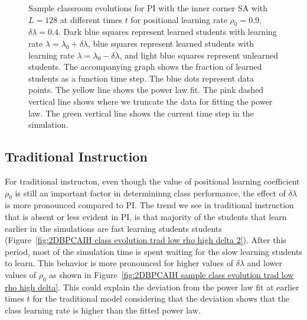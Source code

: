 \begin{figure}[htbp!]
   \caption{Sample classroom evolutions for PI with the inner corner SA with $L=128$ at different times $t$ for positional learning rate $\rho_0=0.9$, $\delta\lambda = 0.4$.
   Dark blue squares represent learned students with learning rate $\lambda = \lambda_0 + \delta\lambda$, blue squares represent learned students with learning rate $\lambda = \lambda_0 - \delta\lambda$, and light blue squares represent unlearned students.
   The accompanying graph shows the fraction of learned students as a function time step.
   The blue dots represent data points. 
   The yellow line shows the power law fit.
   The pink dashed vertical line shows where we truncate the data for fitting the power law.
   The green vertical line shows the current time step in the simulation.
   }
   \label{fig:2DBPCAIH sample class evolution high rho high delta}
\end{figure}

\subsection{Traditional Instruction}
For traditional instructon, even though the value of positional learning coefficient $\rho_0$ is still an important factor in determininng class performance, the effect of $\delta\lambda$ is more pronounced compared to PI.
The trend we see in traditional instruction that is absent or less evident in PI, is that majority of the students that learn earlier in the simulations are fast learning students students (Figure~\ref{fig:2DBPCAIH class evolution trad low rho high delta 2}). 
After this period, most of the simulation time is spent waiting for the slow learning students to learn.
This behavior is more pronounced for higher values of $\delta\lambda$ and lower values of $\rho_0$ as shown in Figure~\ref{fig:2DBPCAIH sample class evolution trad low rho high delta}.
This could explain the deviation from the power law fit at earlier times $t$ for the traditional model considering that the deviation shows that the class learning rate is higher than the fitted power law.

